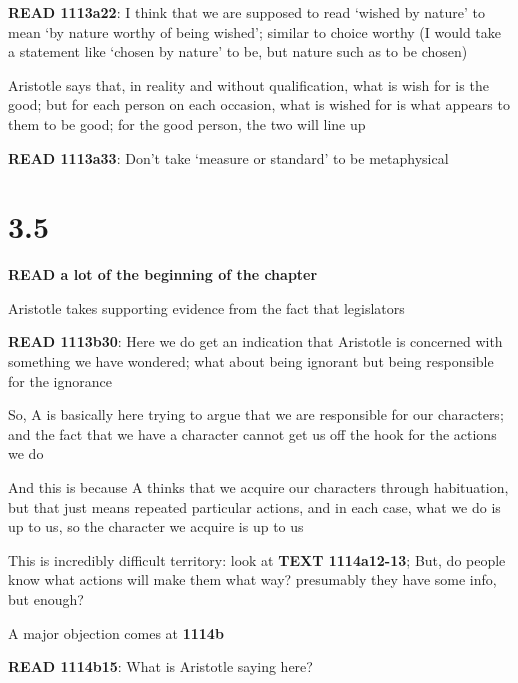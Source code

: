 \documentclass[11pt]{article}
\begin{document}
\noindent\textbf{READ 1113a22}: I think that we are supposed to read `wished by nature' to mean `by nature worthy of being wished'; similar to choice worthy (I would take a statement like `chosen by nature' to be, but nature such as to be chosen)
\vspace*{2mm}

\noindent Aristotle says that, in reality and without qualification, what is wish for is the good; but for each person on each occasion, what is wished for is what appears to them to be good; for the good person, the two will line up
\vspace*{2mm}

\noindent\textbf{READ 1113a33}: Don't take `measure or standard' to be metaphysical

\section*{3.5}

\noindent\textbf{READ a lot of the beginning of the chapter}
\vspace*{2mm}

\noindent Aristotle takes supporting evidence from the fact that legislators 
\vspace*{2mm}

\noindent\textbf{READ 1113b30}: Here we do get an indication that Aristotle is concerned with something we have wondered; what about being ignorant but being responsible for the ignorance
\vspace*{2mm}

\noindent So, A is basically here trying to argue that we are responsible for our characters; and the fact that we have a character cannot get us off the hook for the actions we do
\vspace*{2mm}

\noindent And this is because A thinks that we acquire our characters through habituation, but that just means repeated particular actions, and in each case, what we do is up to us, so the character we acquire is up to us
\vspace*{2mm}

\noindent This is incredibly difficult territory: look at \textbf{TEXT 1114a12-13}; But, do people know what actions will make them what way? presumably they have some info, but enough?
\vspace*{2mm}

\noindent A major objection comes at \textbf{1114b}
\vspace*{2mm}

\noindent\textbf{READ 1114b15}: What is Aristotle saying here?
\end{document}
